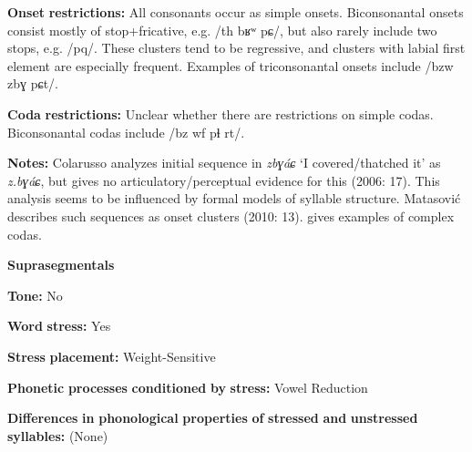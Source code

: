 \begin{styleBody}
\textbf{Onset} \textbf{restrictions:} All consonants occur as simple onsets. Biconsonantal onsets consist mostly of stop+fricative, e.g. /th bʁʷ pɕ/, but also rarely include two stops, e.g. /pq/. These clusters tend to be regressive, and clusters with labial first element are especially frequent. Examples of triconsonantal onsets include /bzw zbɣ pɕt/.
\end{styleBody}

\begin{styleBody}
\textbf{Coda} \textbf{restrictions:} Unclear whether there are restrictions on simple codas. Biconsonantal codas include /bz wf pɬ rt/.
\end{styleBody}

\begin{styleBody}
\textbf{Notes:} Colarusso analyzes initial sequence in \textit{zbɣáɕ} ‘I covered/thatched it’ as \textit{z.bɣáɕ}, but gives no articulatory/perceptual evidence for this (2006: 17). This analysis seems to be influenced by formal models of syllable structure. Matasović describes such sequences as onset clusters (2010: 13). \citet{Applebaum2013} gives examples of complex codas.
\end{styleBody}

\begin{styleBody}
\textbf{Suprasegmentals}
\end{styleBody}

\begin{styleBody}
\textbf{Tone:} No
\end{styleBody}

\begin{styleBody}
\textbf{Word} \textbf{stress:} Yes
\end{styleBody}

\begin{styleBody}
\textbf{Stress} \textbf{placement:} Weight-Sensitive
\end{styleBody}

\begin{styleBody}
\textbf{Phonetic} \textbf{processes} \textbf{conditioned} \textbf{by} \textbf{stress:} Vowel Reduction
\end{styleBody}

\begin{styleBody}
\textbf{Differences} \textbf{in} \textbf{phonological} \textbf{properties} \textbf{of} \textbf{stressed} \textbf{and} \textbf{unstressed} \textbf{syllables:} (None)
\end{styleBody}

